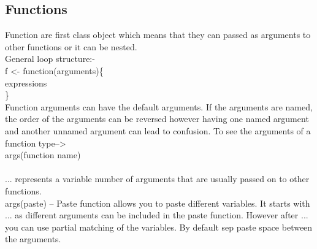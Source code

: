 \documentclass[a4paper,oneside, 12pt]{report}
\begin{document}
\subsection{Functions}
Function are first class object which means that they can passed as arguments to other functions or it can be nested.\\
General loop structure:- \\
f <- function(arguments)\{\\
expressions\\
\}\\
Function arguments can have the default arguments. If the arguments are named, the order of the arguments can be reversed however having one named argument and another unnamed argument can lead to confusion.
To see the arguments of a function type-->\\
args(function name)\\
\\
... represents a variable number of arguments that are usually passed on to other functions. \\
args(paste) -- Paste function allows you to paste different variables. It starts with ... as different arguments can be included in the paste function. However after ... you can use partial matching of the variables. By default sep paste space between the arguments.\\
\end{document}

